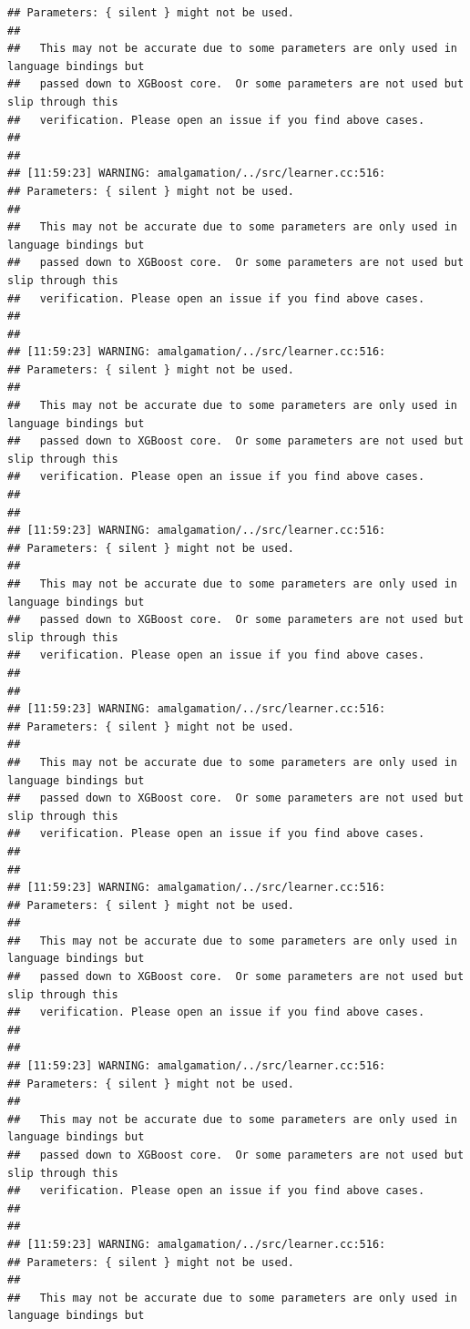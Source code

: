 \documentclass[AMS,STIX2COL]{WileyNJD-v2}\usepackage[]{graphicx}\usepackage[]{color}
\makeatletter
\newenvironment{kframe}{%
 \def\at@end@of@kframe{}%
 \ifinner\ifhmode%
  \def\at@end@of@kframe{\end{minipage}}%
  \begin{minipage}{\columnwidth}%
 \fi\fi%
 \def\FrameCommand##1{\hskip\@totalleftmargin \hskip-\fboxsep
 \colorbox{shadecolor}{##1}\hskip-\fboxsep
     \hskip-\linewidth \hskip-\@totalleftmargin \hskip\columnwidth}%
 \MakeFramed {\advance\hsize-\width
   \@totalleftmargin\z@ \linewidth\hsize
   \@setminipage}}%
 {\par\unskip\endMakeFramed%
 \at@end@of@kframe}
\newenvironment{knitrout}{}{} %
\makeatother
\begin{document}
\begin{knitrout}
\begin{kframe}
\begin{verbatim}
## Parameters: { silent } might not be used.
## 
##   This may not be accurate due to some parameters are only used in language bindings but
##   passed down to XGBoost core.  Or some parameters are not used but slip through this
##   verification. Please open an issue if you find above cases.
## 
## 
## [11:59:23] WARNING: amalgamation/../src/learner.cc:516: 
## Parameters: { silent } might not be used.
## 
##   This may not be accurate due to some parameters are only used in language bindings but
##   passed down to XGBoost core.  Or some parameters are not used but slip through this
##   verification. Please open an issue if you find above cases.
## 
## 
## [11:59:23] WARNING: amalgamation/../src/learner.cc:516: 
## Parameters: { silent } might not be used.
## 
##   This may not be accurate due to some parameters are only used in language bindings but
##   passed down to XGBoost core.  Or some parameters are not used but slip through this
##   verification. Please open an issue if you find above cases.
## 
## 
## [11:59:23] WARNING: amalgamation/../src/learner.cc:516: 
## Parameters: { silent } might not be used.
## 
##   This may not be accurate due to some parameters are only used in language bindings but
##   passed down to XGBoost core.  Or some parameters are not used but slip through this
##   verification. Please open an issue if you find above cases.
## 
## 
## [11:59:23] WARNING: amalgamation/../src/learner.cc:516: 
## Parameters: { silent } might not be used.
## 
##   This may not be accurate due to some parameters are only used in language bindings but
##   passed down to XGBoost core.  Or some parameters are not used but slip through this
##   verification. Please open an issue if you find above cases.
## 
## 
## [11:59:23] WARNING: amalgamation/../src/learner.cc:516: 
## Parameters: { silent } might not be used.
## 
##   This may not be accurate due to some parameters are only used in language bindings but
##   passed down to XGBoost core.  Or some parameters are not used but slip through this
##   verification. Please open an issue if you find above cases.
## 
## 
## [11:59:23] WARNING: amalgamation/../src/learner.cc:516: 
## Parameters: { silent } might not be used.
## 
##   This may not be accurate due to some parameters are only used in language bindings but
##   passed down to XGBoost core.  Or some parameters are not used but slip through this
##   verification. Please open an issue if you find above cases.
## 
## 
## [11:59:23] WARNING: amalgamation/../src/learner.cc:516: 
## Parameters: { silent } might not be used.
## 
##   This may not be accurate due to some parameters are only used in language bindings but

\end{verbatim}
\end{kframe}
\end{knitrout}
\end{document}
